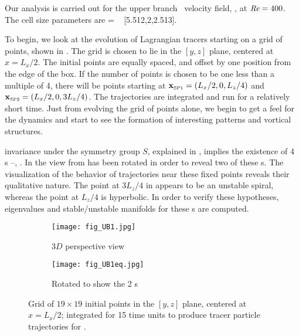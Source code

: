 Our analysis is carried out for the upper branch \eqv\ velocity field, 
{\tEQtwo}, at $\textit{Re} = 400$. 
The cell size parameters are 
\beq   
[L_x,2,L_z]
         = \; [2\pi/1.14,2,4\pi/5]
         ~ [5.512,2,2.513].

To begin, we look at the evolution of Lagrangian tracers starting on a 
grid of points, shown in . The grid is chosen to lie 
in the $[y,z]$ plane, centered at $x = L_x/2$. The initial points are 
equally spaced, and offset by one position from the edge of the box. If 
the number of points is chosen to be one less than a multiple of 4, there 
will be points starting at $\xSP{1}=(L_x/2,0,L_z/4)$ and 
$\xSP{2}=(L_x/2,0,3L_z/4)$. The trajectories are integrated 
and run for a relatively short time. Just from evolving the 
grid of points alone, we begin to get a feel for the dynamics and start 
to see the formation of interesting patterns and vortical structures. 

{\tEQtwo} invariance under the symmetry group $S$, explained  in 
, implies the existence of 4 \stagp s 
--, . In  the view 
from  has been rotated in order to reveal two of 
these \stagp s. The visualization of the behavior of trajectories near 
these fixed points reveals their  qualitative nature. The point at 
$3L_z/4$ in  appears to be an unstable spiral, 
whereas the point at $L_z/4$ is hyperbolic. In order to verify these 
hypotheses, eigenvalues and stable/unstable manifolds for these \stagp s 
are computed. 

\begin{figure}
\centering
    \begin{subfigure}{0.98\textwidth}
    \texttt{[image: fig\_UB1.jpg]}
      \caption{
        $3D$ perspective view
       }
      \label{fig:UBs_a}
    \end{subfigure}

    \begin{subfigure}{0.98\textwidth}
    \texttt{[image: fig\_UB1eq.jpg]}
      \caption{
        Rotated to show the 2 \stagp s
       }
      \label{fig:UBs_b}
    \end{subfigure}
    \caption{
Grid of $19 \times 19$  initial points in the $[y,z]$ plane, centered at 
$x = L_x/2$; integrated for 15 time units to produce tracer particle 
trajectories for {\tEQtwo}.} 
\label{fig:UBs}
 \end{figure}


